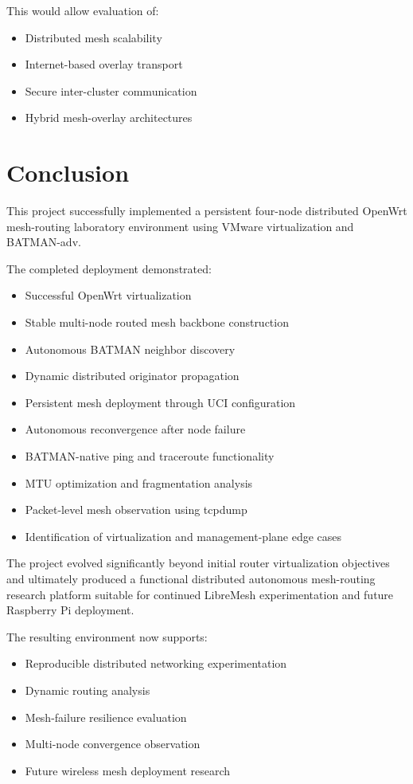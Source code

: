 \documentclass[conference]{IEEEtran}
\begin{document}
This would allow evaluation of:
\begin{itemize}
    \item Distributed mesh scalability
    \item Internet-based overlay transport
    \item Secure inter-cluster communication
    \item Hybrid mesh-overlay architectures
\end{itemize}

\section{Conclusion}

This project successfully implemented a persistent four-node distributed OpenWrt mesh-routing laboratory environment using VMware virtualization and BATMAN-adv.

The completed deployment demonstrated:

\begin{itemize}
    \item Successful OpenWrt virtualization
    \item Stable multi-node routed mesh backbone construction
    \item Autonomous BATMAN neighbor discovery
    \item Dynamic distributed originator propagation
    \item Persistent mesh deployment through UCI configuration
    \item Autonomous reconvergence after node failure
    \item BATMAN-native ping and traceroute functionality
    \item MTU optimization and fragmentation analysis
    \item Packet-level mesh observation using tcpdump
    \item Identification of virtualization and management-plane edge cases
\end{itemize}

The project evolved significantly beyond initial router virtualization objectives and ultimately produced a functional distributed autonomous mesh-routing research platform suitable for continued LibreMesh experimentation and future Raspberry Pi deployment.

The resulting environment now supports:

\begin{itemize}
    \item Reproducible distributed networking experimentation
    \item Dynamic routing analysis
    \item Mesh-failure resilience evaluation
    \item Multi-node convergence observation
    \item Future wireless mesh deployment research
\end{itemize}
\end{document}
